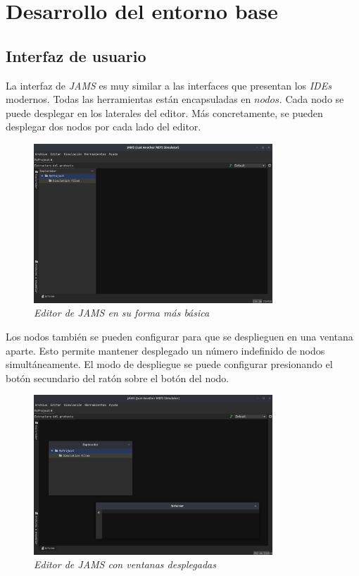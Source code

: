 \chapter{Desarrollo del entorno base}\label{ch:desarrollo-del-entorno-base}


\section{Interfaz de usuario}\label{sec:interfaz-de-usuario}

La interfaz de \textit{JAMS} es muy similar a las interfaces que presentan los \textit{IDEs} modernos.
Todas las herramientas están encapsuladas en $nodos$.
Cada nodo se puede desplegar en los laterales del editor.
Más concretamente, se pueden desplegar dos nodos por cada lado del editor.

\begin{figure}[H]
    \centering
    \includegraphics[width=0.8\textwidth]{images/base/jams-basic}
    \caption{\textit{Editor de \textit{JAMS} en su forma más básica}}
    \label{fig:jams-basic}
\end{figure}

Los nodos también se pueden configurar para que se desplieguen
en una ventana aparte.
Esto permite mantener desplegado un número indefinido de nodos simultáneamente.
El modo de despliegue se puede configurar presionando
el botón secundario del ratón sobre el botón del nodo.

\begin{figure}[H]
    \centering
    \includegraphics[width=0.8\textwidth]{images/base/jams-windows}
    \caption{\textit{Editor de \textit{JAMS} con ventanas desplegadas}}
    \label{fig:jams-windows}
\end{figure}

